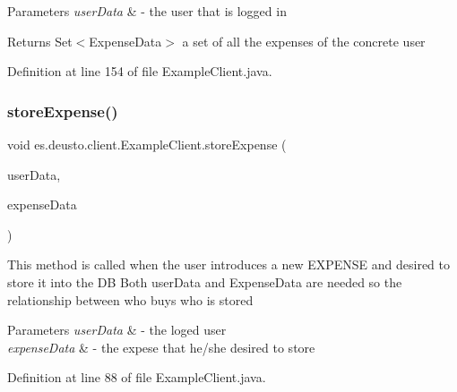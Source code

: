 \begin{DoxyParams}{Parameters}
{\em user\+Data} & -\/ the user that is logged in \\
\hline
\end{DoxyParams}
\begin{DoxyReturn}{Returns}
Set$<$\+Expense\+Data$>$ a set of all the expenses of the concrete user 
\end{DoxyReturn}


Definition at line 154 of file Example\+Client.\+java.

\mbox{\label{classes_1_1deusto_1_1client_1_1_example_client_aba5fe3dfb882ef22d0bd49b5915871d3}} 
\subsubsection{\texorpdfstring{store\+Expense()}{storeExpense()}}
{\footnotesize\ttfamily void es.\+deusto.\+client.\+Example\+Client.\+store\+Expense (\begin{DoxyParamCaption}\item[{\hyperlink{classes_1_1deusto_1_1serialization_1_1_user_data}{User\+Data}}]{user\+Data,  }\item[{\hyperlink{classes_1_1deusto_1_1serialization_1_1_expense_data}{Expense\+Data}}]{expense\+Data }\end{DoxyParamCaption})}

This method is called when the user introduces a new E\+X\+P\+E\+N\+SE and desired to store it into the DB Both user\+Data and Expense\+Data are needed so the relationship between who buys who is stored 
\begin{DoxyParams}{Parameters}
{\em user\+Data} & -\/ the loged user \\
\hline
{\em expense\+Data} & -\/ the expese that he/she desired to store \\
\hline
\end{DoxyParams}


Definition at line 88 of file Example\+Client.\+java.

\mbox{\label{classes_1_1deusto_1_1client_1_1_example_client_afbee30635a2cfe7fb7cfc58393b40bfb}} 
